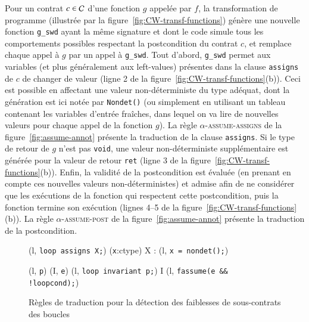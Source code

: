 Pour un contrat $c\in{\ensuremath\mathcal{C}}$ d'une fonction $g$ appelée par $f$, la transformation
de programme (illustrée par la figure~\ref{fig:CW-transf-functions}) génère une
nouvelle fonction \lstinline{g_swd} ayant la même signature et dont le code
simule tous les comportements possibles respectant la postcondition du
contrat $c$, et remplace chaque appel à $g$ par un appel à \lstinline{g_swd}.
Tout d'abord, \lstinline{g_swd} permet aux variables (et plus généralement aux
left-values) présentes dans la clause \lstinline'assigns' de $c$ de changer de
valeur (ligne 2 de la figure~\ref{fig:CW-transf-functions}(b)).
Ceci est possible en affectant une valeur non-déterministe du type adéquat,
dont la génération est ici notée par \lstinline{Nondet()} (ou simplement en
utilisant un tableau contenant les variables d'entrée fraîches, dans lequel on
va lire de nouvelles valeurs pour chaque appel de la fonction $g$).
La règle \textsc{$\alpha$-assume-assigns} de la figure~\ref{fig:assume-annot}
présente la traduction de la clause \lstinline'assigns'.
Si le type de retour de $g$ n'est pas \lstinline{void}, une valeur
non-déterministe supplémentaire est générée pour la valeur de retour
\lstinline{ret} (ligne 3 de la figure~\ref{fig:CW-transf-functions}(b)).
Enfin, la validité de la postcondition est évaluée (en prenant en compte ces
nouvelles valeurs non-déterministes) et admise afin de ne considérer que les
exécutions de la fonction qui respectent cette postcondition, puis la fonction
termine son exécution (lignes 4--5 de la
figure~\ref{fig:CW-transf-functions}(b)).
La règle \textsc{$\alpha$-assume-post} de la figure~\ref{fig:assume-annot}
présente la traduction de la postcondition.

\begin{figure}[tb]
  \scriptsize{
    {
      {}
      {(l, \mbox{\lstinline'loop assigns X;'})
        \forall (\mbox{\lstinline'x'}:ctype) \in X :
        (l, \mbox{\lstinline'x = nondet();'})}{}
    }

    {
      {(l, \mbox{\lstinline'p'})  (I, \mbox{\lstinline'e'})}
      {
        (l, \mbox{\lstinline'loop invariant p;'}) 
        I \concat (l, \mbox{\lstinline'fassume(e && !loopcond);'})
      }{}
    }

  }
  \caption{Règles de traduction pour la détection des faiblesses de
    sous-contrats des boucles}
  \label{fig:assume-loop-annot}
\end{figure}

